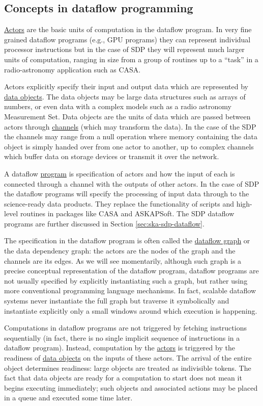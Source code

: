 \documentclass[11pt,a4paper]{article}
\begin{document}
\subsection{Concepts in dataflow programming}

\underline{Actors} are the basic units of computation in the dataflow
program. In very fine grained dataflow programs (e.g., GPU programs)
they can represent individual processor instructions but in the case
of SDP they will represent much larger units of computation, ranging
in size from a group of routines up to a ``task'' in a radio-astronomy
application such as CASA.  

Actors explicitly specify their input and output data which are
represented by \underline{data objects}. The data objects may be large
data structures such as arrays of numbers, or even data with a complex
models such as a radio astronomy Measurement Set. Data objects are the
units of data which are passed between actors through
\underline{channels} (which may transform the data). In the case of
the SDP the channels may range from a null operation where memory
containing the data object is simply handed over from one actor to
another, up to complex channels which buffer data on storage devices
or transmit it over the network.

A dataflow \underline{program} is specification of actors and how the
input of each is connected through a channel with the outputs of other
actors. In the case of SDP the dataflow programs will specify the
processing of input data through to the science-ready data
products. They replace the functionality of scripts and high-level
routines in packages like CASA and ASKAPSoft. The SDP dataflow
programs are further discussed in Section \ref{sec:ska-sdp-dataflow}.

The specification in the dataflow program is often called the
\underline{dataflow graph} or the data dependency graph: the actors
are the nodes of the graph and the channels are its edges. As we will
see momentarily, although such graph is a precise conceptual
representation of the dataflow program, dataflow programs are not
usually specified by explicitly instantiating such a graph, but rather
using more conventional programming language mechanisms. In fact,
scalable dataflow
\citep{Bosilca6008964,Wozniak:2012:TDD:2443416.2443421} systems never
instantiate the full graph but traverse it symbolically and
instantiate explicitly only a small windows around which execution is
happening.

Computations in dataflow programs are not triggered by fetching
instructions sequentially (in fact, there is no single implicit
sequence of instructions in a dataflow program). Instead, computation
by the \underline{actors} is triggered by the readiness of
\underline{data objects} on the inputs of these actors. The arrival of
the entire object determines readiness: large objects are treated as
indivisible tokens. The fact that data objects are ready for a
computation to start does not mean it begins executing immediately;
such objects and associated actions may be placed in a queue and
executed some time later.
\end{document}
